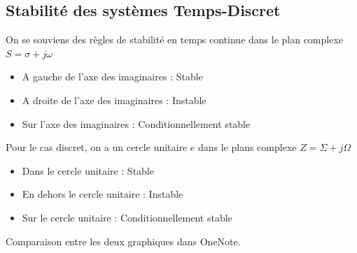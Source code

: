 \documentclass{article}
\theoremstyle{plain}%
\theoremstyle{definition}
\theoremstyle{remark}
\begin{document}
\subsection{Stabilité des systèmes Temps-Discret}
On se souviens des règles de stabilité en temps continue dans le plan complexe $ S = \sigma + j \omega  $ 
\begin{itemize}
    \item A gauche de l'axe des imaginaires : Stable 
    \item A droite de l'axe des imaginaires : Instable
    \item Sur l'axe des imaginaires : Conditionnellement stable
\end{itemize}
Pour le cas discret, on a un cercle unitaire $ e $ dans le plans complexe $ Z = \Sigma + j \Omega  $ 
\begin{itemize}
    \item Dans le cercle unitaire : Stable
    \item En dehors le cercle unitaire : Instable
    \item Sur le cercle unitaire : Conditionnellement stable
\end{itemize}
Comparaison entre les deux graphiques dans OneNote.
\end{document}
